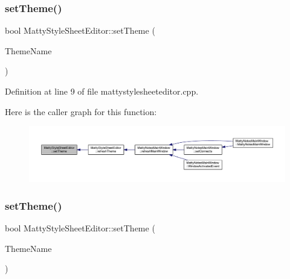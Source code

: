 \subsubsection{\texorpdfstring{set\+Theme()}{setTheme()}\hspace{0.1cm}{\footnotesize\ttfamily [1/2]}}
{\footnotesize\ttfamily bool Matty\+Style\+Sheet\+Editor\+::set\+Theme (\begin{DoxyParamCaption}\item[{const Q\+String \&}]{Theme\+Name }\end{DoxyParamCaption})\hspace{0.3cm}{\ttfamily [static]}}



Definition at line 9 of file mattystylesheeteditor.\+cpp.

Here is the caller graph for this function\+:
\nopagebreak
\begin{figure}[H]
\begin{center}
\leavevmode
\includegraphics[width=350pt]{classMattyStyleSheetEditor_aec3ccdf356aab4c3156562465e779498_icgraph}
\end{center}
\end{figure}
\hypertarget{classMattyStyleSheetEditor_aea0577b5a1a832ae46f9ad8c4fbe79e2}{}\label{classMattyStyleSheetEditor_aea0577b5a1a832ae46f9ad8c4fbe79e2} 
\subsubsection{\texorpdfstring{set\+Theme()}{setTheme()}\hspace{0.1cm}{\footnotesize\ttfamily [2/2]}}
{\footnotesize\ttfamily bool Matty\+Style\+Sheet\+Editor\+::set\+Theme (\begin{DoxyParamCaption}\item[{\hyperlink{mattystylesheeteditor_8h_ad58d92f62ffa3431951b8423c85d841d}{Default\+Theme}}]{Theme\+Name }\end{DoxyParamCaption})\hspace{0.3cm}{\ttfamily [static]}}



